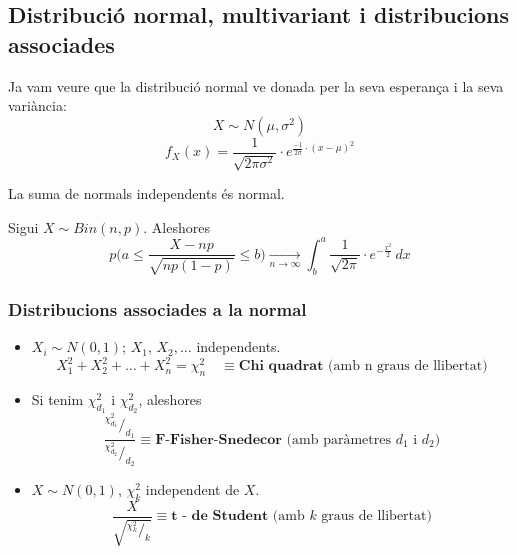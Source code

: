 \subsection{Distribució normal, multivariant i distribucions associades}

Ja vam veure que la distribució normal ve donada per la seva esperança i la seva variància: 
\[
  X \sim N(\mu, \sigma^{2})
\]
\[
  f_{X}(x) = \frac{1}{\sqrt{2\pi\sigma^{2}}}\cdot e^{\frac{-1}{2\sigma}\cdot(x-\mu)^{2}}
\]

La suma de normals independents és normal.

\begin{thm}
  Sigui $X\sim Bin(n,p)$. Aleshores 
  \[
    p\Bigg(a \leq \frac{X-np}{\sqrt{np(1-p)}}\leq b\Bigg)\xrightarrow[n\to\infty]{} \int_{b}^{a} \frac{1}{\sqrt{2\pi}}\cdot e^{-\frac{x^{2}}{2}}\, dx
  \]
\end{thm}

\newpage

\subsubsection{Distribucions associades a la normal}
\begin{itemize}
    \item $X_{i}\sim N(0,1)$; $X_{1}, \, X_{2},\ldots$ independents. 
    \[
      X_{1}^{2}+X_{2}^{2}+\ldots+X_{n}^{2}=\chi_{n}^{2} \quad \equiv \textbf{Chi quadrat} \text{ (amb n graus de llibertat})
    \]
    \item Si tenim $\chi_{d_{1}}^{2}$ i $\chi_{d_{2}}^{2}$, aleshores
    \[
      \frac{^{\chi_{d_{1}}^{2}} / _{d_{1}}}{^{\chi_{d_{2}}^{2}} / _{d_{2}}} \equiv \textbf{F-Fisher-Snedecor} \text{ (amb paràmetres $d_{1}$ i $d_{2}$)}
    \]
    \item $X\sim N(0,1)$, $\chi_{k}^{2}$ independent de $X$.
    \[
      \frac{X}{\sqrt{^{\chi_{k}^{2}} / _k}} \equiv \textbf{t - de Student} \text{ (amb $k$ graus de llibertat)}
    \]
\end{itemize}
